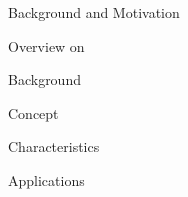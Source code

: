 \begin{section}{Background and Motivation}
\end{section}

\begin{section}{Overview on }
	\begin{subsection}{Background}

	\end{subsection}

	\begin{subsection}{Concept}

	\end{subsection}

	\begin{subsection}{Characteristics}

	\end{subsection}

	\begin{subsection}{Applications}

	\end{subsection}
\end{section}

